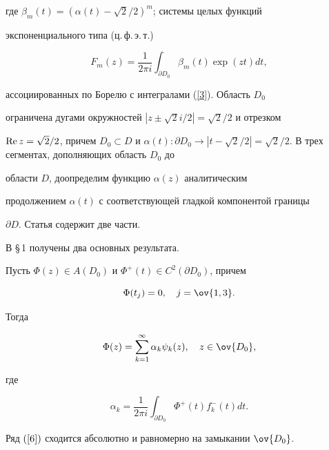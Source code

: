 где $\beta_m(t)=(\alpha(t)-\sqrt2/2)^m$; системы целых функций


экспоненциального типа (ц.\,ф.\,э.\,т.)


\begin{equation}\label{4}


F_m(z)=\frac{1}{2\pi i}\int_{\partial D_0}\beta_m(t)\exp(zt)dt ,


\end{equation}


ассоциированных по Борелю с интегралами (\ref{3}). Область $D_0$


ограничена дугами окружностей $|z\pm\sqrt2i/2|=\sqrt2/2$ и отрезком


$\re z=\sqrt2/2$, причем $D_0\subset D$ и $\alpha(t): \partial D_0 \to


|t-\sqrt2/2|=\sqrt2/2$. В трех сегментах, дополняющих область $D_0$ до


области $D$, доопределим функцию $\alpha(z)$ аналитическим


продолжением $\alpha(t)$ с соответствующей гладкой компонентой границы


$\partial D$. Статья содержит две части.


В \S\,1 получены два основных результата.





\begin{thm}


Пусть $\Phi(z)\in A(D_0)$ и $\Phi^+(t)\in C^2(\partial D_0)$, причем 


\begin{equation}\label{5}


\Phi(t_j)=0,\quad j=\ov{1,3}.


\end{equation}


Тогда


\begin{equation}\label{6}


\Phi(z)=\sum_{k=1}^\infty\alpha_k\psi_k(z), \quad z\in\ov{D_0},


\end{equation}


где


\begin{equation}\label{7}


\alpha_k=\frac{1}{2\pi i} \int_{\partial D_0}\Phi^+(t)f_k^-(t)dt.


\end{equation}





Ряд $(\ref{6})$ сходится абсолютно и равномерно на замыкании $\ov{D_0}$.


\end{thm}


